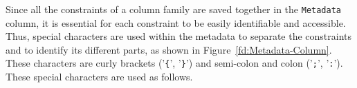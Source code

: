 % 	
		
Since all the  constraints of a column family are saved together in the
\texttt{Metadata} column,  it is essential for each constraint to be easily
identifiable and accessible.  Thus, special characters are used within the
metadata to separate the constraints and to identify its different parts, as
shown in Figure~\ref{fd:Metadata-Column}. These characters are curly brackets
('\texttt{\{}', '\texttt{\}}') and semi-colon and colon ('\texttt{;}',
'\texttt{:}'). These special characters are used as follows.



% 
% 


	
